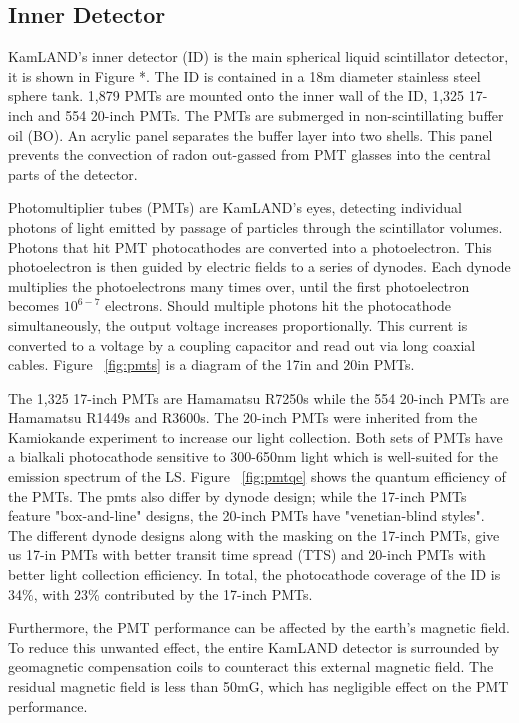 \subsection{Inner Detector}
KamLAND's inner detector (ID) is the main spherical liquid scintillator detector, it is shown in Figure *. The ID is contained in a 18m diameter stainless steel sphere tank. 1,879 PMTs are mounted onto the inner wall of the ID, 1,325 17-inch and 554 20-inch PMTs. The PMTs are submerged in non-scintillating buffer oil (BO). An acrylic panel separates the buffer layer into two shells. This panel prevents the convection of radon out-gassed from PMT glasses into the central parts of the detector.

Photomultiplier tubes (PMTs) are KamLAND's eyes, detecting individual photons of light emitted by passage of particles through the scintillator volumes. Photons that hit PMT photocathodes are converted into a photoelectron. This photoelectron is then guided by electric fields to a series of dynodes. Each dynode multiplies the photoelectrons many times over, until the first photoelectron becomes $10^{6-7}$ electrons. Should multiple photons hit the photocathode simultaneously, the output voltage increases proportionally. This current is converted to a voltage by a coupling capacitor and read out via long coaxial cables. Figure ~\ref{fig:pmts} is a diagram of the 17in and 20in PMTs.

The 1,325 17-inch PMTs are Hamamatsu R7250s while the 554 20-inch PMTs are Hamamatsu R1449s and R3600s. The 20-inch PMTs were inherited from the Kamiokande experiment to increase our light collection. Both sets of PMTs have a bialkali photocathode sensitive to 300-650nm light which is well-suited for the emission spectrum of the LS. Figure ~\ref{fig:pmtqe} shows the quantum efficiency of the PMTs. The pmts also differ by dynode design; while the 17-inch PMTs feature "box-and-line" designs, the 20-inch PMTs have "venetian-blind styles". The different dynode designs along with the masking on the 17-inch PMTs, give us 17-in PMTs with better transit time spread (TTS) and 20-inch PMTs with better light collection efficiency. In total, the photocathode coverage of the ID is 34\%, with 23\% contributed by the 17-inch PMTs.

Furthermore, the PMT performance can be affected by the earth's magnetic field. To reduce this unwanted effect, the entire KamLAND detector is surrounded by geomagnetic compensation coils to counteract this external magnetic field. The residual magnetic field is less than 50mG, which has negligible effect on the PMT performance.

